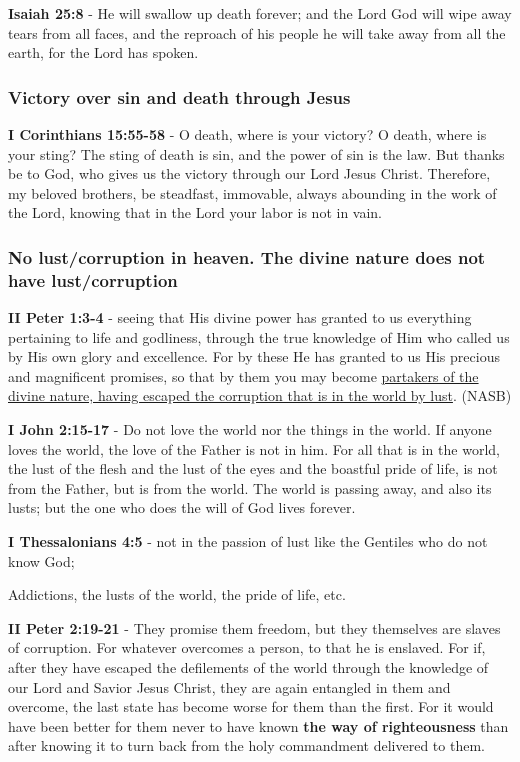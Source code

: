 \documentclass[11pt]{article}
\begin{document}
\textbf{Isaiah 25:8} - He will swallow up death forever; and the Lord God will wipe away tears from all faces, and the reproach of his people he will take away from all the earth, for the Lord has spoken.

\subsubsection{Victory over sin and death through Jesus}
\label{sec:org040007f}
\textbf{I Corinthians 15:55-58} - O death, where is your victory? O death, where is your sting?  The sting of death is sin, and the power of sin is the law.  But thanks be to God, who gives us the victory through our Lord Jesus Christ.  Therefore, my beloved brothers, be steadfast, immovable, always abounding in the work of the Lord, knowing that in the Lord your labor is not in vain.

\subsubsection{No lust/corruption in heaven. The divine nature does not have lust/corruption}
\label{sec:org89a6861}
\textbf{II Peter 1:3-4} - seeing that His divine power has granted to us everything pertaining to life and godliness, through the true knowledge of Him who called us by His own glory and excellence. For by these He has granted to us His precious and magnificent promises, so that by them you may become \uline{partakers of the divine nature, having escaped the corruption that is in the world by lust}. (NASB)

\textbf{I John 2:15-17} - Do not love the world nor the things in the world. If anyone loves the world, the love of the Father is not in him. For all that is in the world, the lust of the flesh and the lust of the eyes and the boastful pride of life, is not from the Father, but is from the world. The world is passing away, and also its lusts; but the one who does the will of God lives forever.

\textbf{I Thessalonians 4:5} - not in the passion of lust like the Gentiles who do not know God;

Addictions, the lusts of the world, the pride of life, etc.

\textbf{II Peter 2:19-21} - They promise them freedom, but they themselves are slaves of corruption. For whatever overcomes a person, to that he is enslaved. For if, after they have escaped the defilements of the world through the knowledge of our Lord and Savior Jesus Christ, they are again entangled in them and overcome, the last state has become worse for them than the first. For it would have been better for them never to have known \textbf{the way of righteousness} than after knowing it to turn back from the holy commandment delivered to them.
\end{document}
